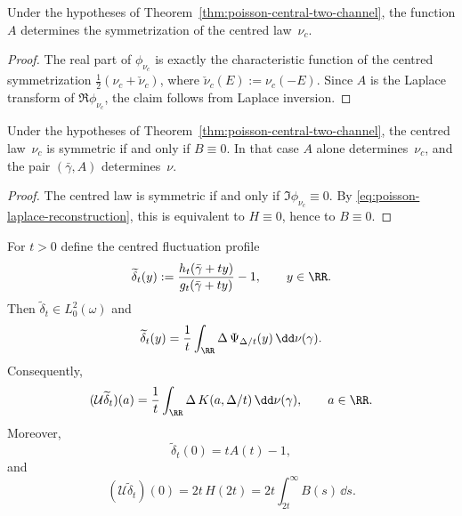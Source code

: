 \begin{corollary}%
\label{cor:poisson-symmetrization}
Under the hypotheses of Theorem~\ref{thm:poisson-central-two-channel}, the
function $A$ determines the symmetrization of the centred law~$\nu_c$.
\end{corollary}

\begin{proof}
The real part of $\phi_{\nu_c}$ is exactly the characteristic function of
the centred symmetrization
$\frac12(\nu_c+\check\nu_c)$, where $\check\nu_c(E):=\nu_c(-E)$.  Since
$A$ is the Laplace transform of $\Re\phi_{\nu_c}$, the claim follows from
Laplace inversion.
\end{proof}

\begin{corollary}%
\label{cor:poisson-symmetric-case}
Under the hypotheses of Theorem~\ref{thm:poisson-central-two-channel}, the
centred law~$\nu_c$ is symmetric if and only if $B\equiv 0$.  In that
case $A$ alone determines~$\nu_c$, and the pair $(\bar\gamma,A)$
determines~$\nu$.
\end{corollary}

\begin{proof}
The centred law is symmetric if and only if
$\Im\phi_{\nu_c}\equiv 0$.  By
\eqref{eq:poisson-laplace-reconstruction}, this is equivalent to
$H\equiv 0$, hence to $B\equiv 0$.
\end{proof}

\begin{theorem}%
\label{thm:poisson-channel-rkhs}
For $t>0$ define the centred fluctuation profile
\[
\widetilde\delta_t(y):=
\frac{h_t(\bar\gamma+ty)}{g_t(\bar\gamma+ty)}-1,
\qquad y\in\RR.
\]
Then $\widetilde\delta_t\in L^2_0(\omega)$ and
\begin{equation}\label{eq:delta-t-secant}
\widetilde\delta_t(y)
=\frac{1}{t}\int_{\RR}\Delta\,\Psi_{\Delta/t}(y)\,\dd\nu(\gamma).
\end{equation}
Consequently,
\begin{equation}\label{eq:delta-t-rkhs}
(\mathcal U\widetilde\delta_t)(a)
=\frac{1}{t}\int_{\RR}\Delta\,K(a,\Delta/t)\,\dd\nu(\gamma),
\qquad a\in\RR.
\end{equation}
Moreover,
\begin{equation}\label{eq:delta-t-origin}
\widetilde\delta_t(0)=tA(t)-1,
\end{equation}
and
\begin{equation}\label{eq:delta-t-rkhs-origin}
(\mathcal U\widetilde\delta_t)(0)=2t\,H(2t)
=2t\int_{2t}^{\infty}B(s)\,\dd s.
\end{equation}
\end{theorem}

